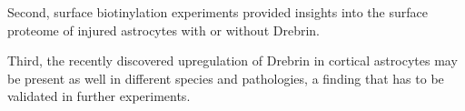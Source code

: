 \documentclass[a4paper,11pt,bibtotocnumbered]{article}
\begin{document}
Second, surface biotinylation experiments provided insights into the surface proteome of injured astrocytes with or without Drebrin. 

Third, the recently discovered upregulation of Drebrin in cortical astrocytes may be present as well in different species and pathologies, a finding that has to be validated in further experiments.


\newpage
\renewcommand\bibname{}


 
 



 
\end{document}
